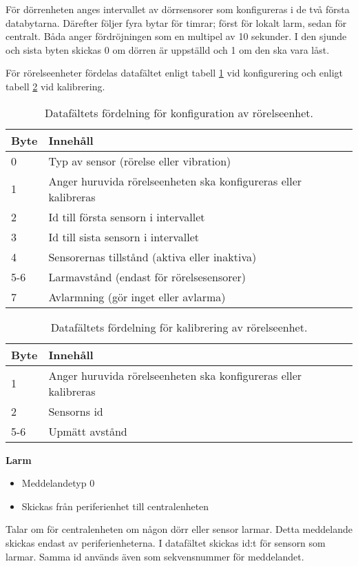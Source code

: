 För dörrenheten anges intervallet av dörrsensorer som konfigureras i de två första databytarna. Därefter följer fyra bytar för timrar; först för lokalt larm, sedan för centralt. Båda anger fördröjningen som en multipel av 10 sekunder. I den sjunde och sista byten skickas 0 om dörren är uppställd och 1 om den ska vara låst.




För rörelseenheter fördelas datafältet enligt tabell \ref{tab:rörelsekonfdata} vid konfigurering och enligt tabell \ref{tab:rörelsekaldata} vid kalibrering.
\begin{table}[htb]
	\centering
	\begin{tabular}{|l|l|}
		\hline
		Byte & Innehåll \\ \hline \hline
		0 & Typ av sensor (rörelse eller vibration) \\ \hline
		1 & Anger huruvida rörelseenheten ska konfigureras eller kalibreras \\ \hline
		2 & Id till första sensorn i intervallet \\ \hline
		3 & Id till sista sensorn i intervallet \\ \hline
		4 & Sensorernas tillstånd (aktiva eller inaktiva) \\ \hline
		5-6 & Larmavstånd (endast för rörelsesensorer) \\ \hline
		7 & Avlarmning (gör inget eller avlarma) \\ \hline
	\end{tabular}
	\caption{Datafältets fördelning för konfiguration av rörelseenhet.}
	\label{tab:rörelsekonfdata}
\end{table}

\begin{table}[htb]
	\centering
	\begin{tabular}{|l|l|}
		\hline
		Byte & Innehåll \\ \hline \hline
		1 & Anger huruvida rörelseenheten ska konfigureras eller kalibreras \\ \hline
		2 & Sensorns id\\ \hline
		5-6 & Upmätt avstånd\\ \hline
	\end{tabular}
	\caption{Datafältets fördelning för kalibrering av rörelseenhet.}
	\label{tab:rörelsekaldata}
\end{table}


\textbf{Larm}
\begin{itemize}
	\item Meddelandetyp 0
	\item Skickas från periferienhet till centralenheten
\end{itemize}	
Talar om för centralenheten om någon dörr eller sensor larmar. Detta meddelande skickas endast av periferienheterna. I datafältet skickas id:t för sensorn som larmar. Samma id används även som sekvensnummer för meddelandet.\\


